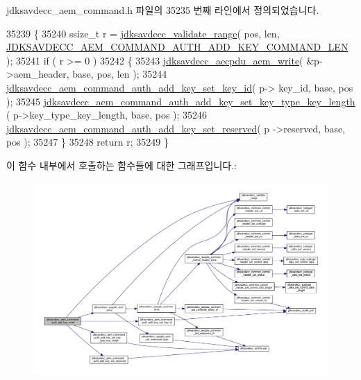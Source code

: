 jdksavdecc\+\_\+aem\+\_\+command.\+h 파일의 35235 번째 라인에서 정의되었습니다.


\begin{DoxyCode}
35239 \{
35240     ssize\_t r = \hyperlink{group__util_ga9c02bdfe76c69163647c3196db7a73a1}{jdksavdecc\_validate\_range}( pos, len, 
      \hyperlink{group__command__auth__add__key_ga49ca7fc0da221477a34bc67310da6e1d}{JDKSAVDECC\_AEM\_COMMAND\_AUTH\_ADD\_KEY\_COMMAND\_LEN} );
35241     \textcolor{keywordflow}{if} ( r >= 0 )
35242     \{
35243         \hyperlink{group__aecpdu__aem_gad658e55771cce77cecf7aae91e1dcbc5}{jdksavdecc\_aecpdu\_aem\_write}( &p->aem\_header, base, pos, len );
35244         \hyperlink{group__command__auth__add__key_gabc1792a1db0b4473836c96d1971d3d6f}{jdksavdecc\_aem\_command\_auth\_add\_key\_set\_key\_id}( p->
      key\_id, base, pos );
35245         \hyperlink{group__command__auth__add__key_ga44e4a2fc450897df2561add7971b7228}{jdksavdecc\_aem\_command\_auth\_add\_key\_set\_key\_type\_key\_length}
      ( p->key\_type\_key\_length, base, pos );
35246         \hyperlink{group__command__auth__add__key_ga3aafa3fe0825b9b11db774ad04dee380}{jdksavdecc\_aem\_command\_auth\_add\_key\_set\_reserved}( p
      ->reserved, base, pos );
35247     \}
35248     \textcolor{keywordflow}{return} r;
35249 \}
\end{DoxyCode}


이 함수 내부에서 호출하는 함수들에 대한 그래프입니다.\+:
\nopagebreak
\begin{figure}[H]
\begin{center}
\leavevmode
\includegraphics[width=350pt]{group__command__auth__add__key_ga548aee15fa3867226ff0886693614b36_cgraph}
\end{center}
\end{figure}


